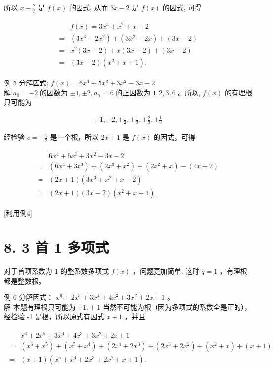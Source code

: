\documentclass[10pt]{article}
\begin{document}
所以 $x-\frac{2}{3}$ 是 $f(x)$ 的因式, 从而 $3 x-2$ 是 $f(x)$ 的因式, 可得

\begin{align*}
\begin{aligned}
& f(x)=3 x^{3}+x^{2}+x-2 \\
= & \left(3 x^{3}-2 x^{2}\right)+\left(3 x^{2}-2 x\right)+(3 x-2) \\
= & x^{2}(3 x-2)+x(3 x-2)+(3 x-2) \\
= & (3 x-2)\left(x^{2}+x+1\right) .
\end{aligned}
\end{align*}

例 5 分解因式: $f(x)=6 x^{4}+5 x^{3}+3 x^{2}-3 x-2$.\\
解 $a_{0}=-2$ 的因数为 $\pm 1, \pm 2, a_{n}=6$ 的正因数为 $1,2,3,6$ 。所以, $f(x)$ 的有理根只可能为

\begin{align*}
\pm 1, \pm 2, \pm \frac{1}{2}, \pm \frac{1}{3}, \pm \frac{2}{3}, \pm \frac{1}{6}
\end{align*}

经检验 $c=-\frac{1}{2}$ 是一个根，所以 $2 x+1$ 是 $f(x)$ 的因式，可得

\begin{align*}
\begin{aligned}
& 6 x^{4}+5 x^{3}+3 x^{2}-3 x-2 \\
= & \left(6 x^{4}+3 x^{3}\right)+\left(2 x^{3}+x^{2}\right)+\left(2 x^{2}+x\right)-(4 x+2) \\
= & (2 x+1)\left(3 x^{3}+x^{2}+x-2\right) \\
= & (2 x+1)(3 x-2)\left(x^{2}+x+1\right) .
\end{aligned}
\end{align*}

[利用例4]

\section*{8. 3 首 1 多项式}
对于首项系数为 1 的整系数多项式 $f(x)$ ，问题更加简单. 这时 $q=1$ ，有理根都是整数根。

例 6 分解因式： $x^{6}+2 x^{5}+3 x^{4}+4 x^{3}+3 x^{2}+2 x+1$ 。\\
解 本题有理根只可能为 $\pm 1 .+1$ 当然不可能为根（因为多项式的系数全是正的），经检验 -1 是根，所以原式有因式 $x+1$ ，并且

\begin{align*}
\begin{aligned}
& x^{6}+2 x^{5}+3 x^{4}+4 x^{3}+3 x^{2}+2 x+1 \\
= & \left(x^{6}+x^{5}\right)+\left(x^{5}+x^{4}\right)+\left(2 x^{4}+2 x^{3}\right)+\left(2 x^{3}+2 x^{2}\right)+\left(x^{2}+x\right)+(x+1) \\
= & (x+1)\left(x^{5}+x^{4}+2 x^{3}+2 x^{2}+x+1\right) .
\end{aligned}
\end{align*}
\end{document}
